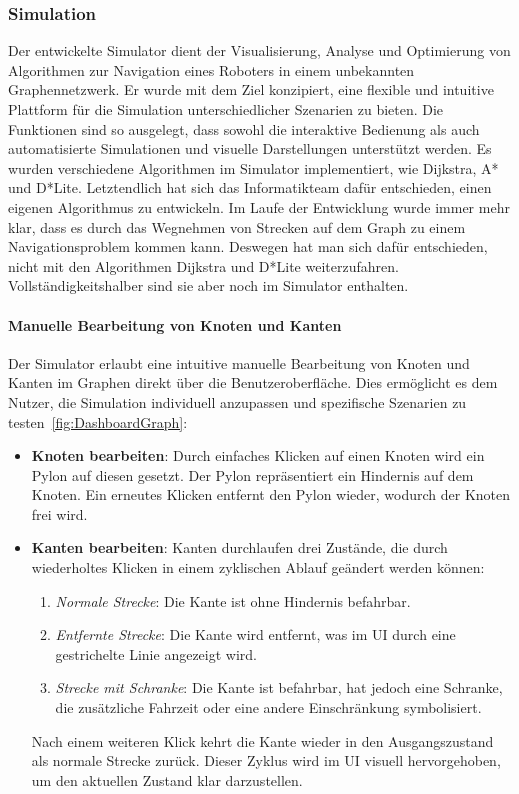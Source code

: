 \documentclass[main.tex]{subfiles} %
\begin{document}
\subsubsection{Simulation}

Der entwickelte Simulator dient der Visualisierung, Analyse und Optimierung von Algorithmen zur Navigation eines Roboters in einem unbekannten Graphennetzwerk. Er wurde mit dem Ziel konzipiert, eine flexible und intuitive Plattform für die Simulation unterschiedlicher Szenarien zu bieten. Die Funktionen sind so ausgelegt, dass sowohl die interaktive Bedienung als auch automatisierte Simulationen und visuelle Darstellungen unterstützt werden.
Es wurden verschiedene Algorithmen im Simulator implementiert, wie Dijkstra, A* und D*Lite.
Letztendlich hat sich das Informatikteam dafür entschieden, einen eigenen Algorithmus zu entwickeln.
Im Laufe der Entwicklung wurde immer mehr klar, dass es durch das Wegnehmen von Strecken auf dem Graph
zu einem Navigationsproblem kommen kann. Deswegen hat man sich dafür entschieden, nicht mit den Algorithmen
Dijkstra und D*Lite weiterzufahren. Vollständigkeitshalber sind sie aber noch im Simulator enthalten.

\paragraph{Manuelle Bearbeitung von Knoten und Kanten}

Der Simulator erlaubt eine intuitive manuelle Bearbeitung von Knoten und Kanten im Graphen direkt über die Benutzeroberfläche. Dies ermöglicht es dem Nutzer, die Simulation individuell anzupassen und spezifische Szenarien zu testen~\ref{fig:DashboardGraph}:

\begin{itemize}
    \item \textbf{Knoten bearbeiten}:  
    Durch einfaches Klicken auf einen Knoten wird ein Pylon auf diesen gesetzt. Der Pylon repräsentiert ein Hindernis auf dem Knoten. Ein erneutes Klicken entfernt den Pylon wieder, wodurch der Knoten frei wird.

    \item \textbf{Kanten bearbeiten}:  
    Kanten durchlaufen drei Zustände, die durch wiederholtes Klicken in einem zyklischen Ablauf geändert werden können:
    \begin{enumerate}
        \item \textit{Normale Strecke}: Die Kante ist ohne Hindernis befahrbar.
        \item \textit{Entfernte Strecke}: Die Kante wird entfernt, was im UI durch eine gestrichelte Linie angezeigt wird.
        \item \textit{Strecke mit Schranke}: Die Kante ist befahrbar, hat jedoch eine Schranke, die zusätzliche Fahrzeit oder eine andere Einschränkung symbolisiert.
    \end{enumerate}
    Nach einem weiteren Klick kehrt die Kante wieder in den Ausgangszustand als normale Strecke zurück. Dieser Zyklus wird im UI visuell hervorgehoben, um den aktuellen Zustand klar darzustellen.
\end{itemize}
\end{document}
